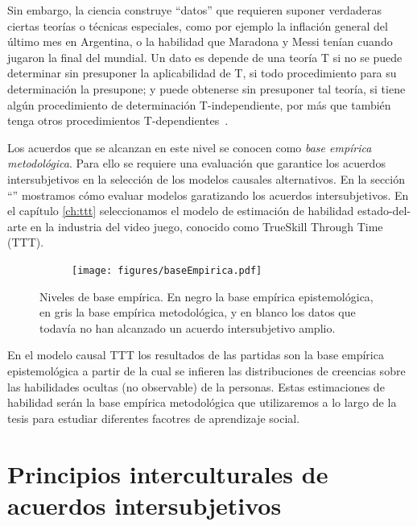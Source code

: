 \documentclass[a4paper,10pt]{book}
\theoremstyle{definition}
\begin{document}
Sin embargo, la ciencia construye ``datos'' que requieren suponer verdaderas ciertas teorías o técnicas especiales, como por ejemplo la inflación general del último mes en Argentina, o la habilidad que Maradona y Messi tenían cuando jugaron la final del mundial.
Un dato es depende de una teoría T si no se puede determinar sin presuponer la aplicabilidad de T, si todo procedimiento para su determinación la presupone; y puede obtenerse sin presuponer tal teoría, si tiene algún procedimiento de determinación T-independiente, por más que también tenga otros procedimientos T-dependientes~\cite{lorenzano2002-concepcionEstructuralista}.

Los acuerdos que se alcanzan en este nivel se conocen como \emph{base empírica metodológica}.
Para ello se requiere una evaluación que garantice los acuerdos intersubjetivos en la selección de los modelos causales alternativos.
En la sección ``'' mostramos cómo evaluar modelos garatizando los acuerdos intersubjetivos.
En el capítulo \ref{ch:ttt} seleccionamos el modelo de estimación de habilidad estado-del-arte en la industria del video juego, conocido como TrueSkill Through Time (TTT).

\begin{figure}[H]
    \centering
    \begin{subfigure}[b]{0.48\textwidth}
    \texttt{[image: figures/baseEmpirica.pdf]}
    \end{subfigure}
    \caption{Niveles de base empírica. En negro la base empírica epistemológica, en gris la base empírica metodológica, y en blanco los datos que todavía no han alcanzado un acuerdo intersubjetivo amplio. }
\end{figure}

En el modelo causal TTT los resultados de las partidas son la base empírica epistemológica a partir de la cual se infieren las distribuciones de creencias sobre las habilidades ocultas (no observable) de la personas.
Estas estimaciones de habilidad serán la base empírica metodológica que utilizaremos a lo largo de la tesis para estudiar diferentes facotres de aprendizaje social.

\section{Principios interculturales de acuerdos intersubjetivos}\label{sec:principios_interculturales}
\end{document}
